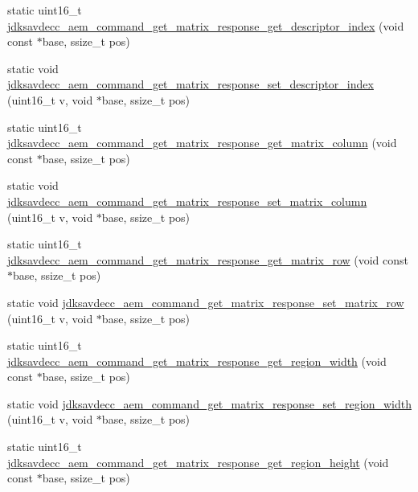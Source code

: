 \begin{DoxyCompactItemize}
\item 
static uint16\+\_\+t \hyperlink{group__command__get__matrix__response_gaa0ada59a8293e8676299e3f5a74556cf}{jdksavdecc\+\_\+aem\+\_\+command\+\_\+get\+\_\+matrix\+\_\+response\+\_\+get\+\_\+descriptor\+\_\+index} (void const $\ast$base, ssize\+\_\+t pos)
\item 
static void \hyperlink{group__command__get__matrix__response_ga90b5890d1ed3e00d4415a92381daef32}{jdksavdecc\+\_\+aem\+\_\+command\+\_\+get\+\_\+matrix\+\_\+response\+\_\+set\+\_\+descriptor\+\_\+index} (uint16\+\_\+t v, void $\ast$base, ssize\+\_\+t pos)
\item 
static uint16\+\_\+t \hyperlink{group__command__get__matrix__response_ga780afedf0a5529396576071d667977c1}{jdksavdecc\+\_\+aem\+\_\+command\+\_\+get\+\_\+matrix\+\_\+response\+\_\+get\+\_\+matrix\+\_\+column} (void const $\ast$base, ssize\+\_\+t pos)
\item 
static void \hyperlink{group__command__get__matrix__response_ga9f938d30a1b2d2f60d7cda173386be03}{jdksavdecc\+\_\+aem\+\_\+command\+\_\+get\+\_\+matrix\+\_\+response\+\_\+set\+\_\+matrix\+\_\+column} (uint16\+\_\+t v, void $\ast$base, ssize\+\_\+t pos)
\item 
static uint16\+\_\+t \hyperlink{group__command__get__matrix__response_ga6fd316bbb922768efe68b9b87efc0386}{jdksavdecc\+\_\+aem\+\_\+command\+\_\+get\+\_\+matrix\+\_\+response\+\_\+get\+\_\+matrix\+\_\+row} (void const $\ast$base, ssize\+\_\+t pos)
\item 
static void \hyperlink{group__command__get__matrix__response_ga49b1cec10016e943a1315de0c149a62a}{jdksavdecc\+\_\+aem\+\_\+command\+\_\+get\+\_\+matrix\+\_\+response\+\_\+set\+\_\+matrix\+\_\+row} (uint16\+\_\+t v, void $\ast$base, ssize\+\_\+t pos)
\item 
static uint16\+\_\+t \hyperlink{group__command__get__matrix__response_ga7050caf28ca30de6a085d4adb1c4b9a6}{jdksavdecc\+\_\+aem\+\_\+command\+\_\+get\+\_\+matrix\+\_\+response\+\_\+get\+\_\+region\+\_\+width} (void const $\ast$base, ssize\+\_\+t pos)
\item 
static void \hyperlink{group__command__get__matrix__response_gad476529cadbe62a7665e3906983fb8fc}{jdksavdecc\+\_\+aem\+\_\+command\+\_\+get\+\_\+matrix\+\_\+response\+\_\+set\+\_\+region\+\_\+width} (uint16\+\_\+t v, void $\ast$base, ssize\+\_\+t pos)
\item 
static uint16\+\_\+t \hyperlink{group__command__get__matrix__response_ga27aab00e7181930414b65f88eed31d6d}{jdksavdecc\+\_\+aem\+\_\+command\+\_\+get\+\_\+matrix\+\_\+response\+\_\+get\+\_\+region\+\_\+height} (void const $\ast$base, ssize\+\_\+t pos)

\end{DoxyCompactItemize}
